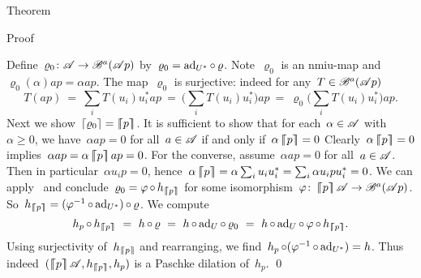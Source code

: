 \documentclass[b]{subfiles}
\begin{document}
\begin{parsec}
\begin{point}{Theorem}
\begin{point}{Proof}
\begin{point}
Define~$\varrho_0 \colon \mathscr{A} \to \mathscr{B}^a(\mathscr{A} p)$
    by~$\varrho_0 = \mathrm{ad}_{U^*} \mathop{\circ} \varrho$.
Note~$\varrho_0$ is an nmiu-map and~$\varrho_0(\alpha)ap = \alpha ap$.
The map~$\varrho_0$ is surjective:
    indeed for any~$T \in \mathscr{B}^a(\mathscr{A} p)$
\begin{equation*}
    T (ap) \ = \ \sum_i T( u_i ) u_i^* ap
           \ = \ \bigl(\sum_i T( u_i ) u_i^*\bigr) ap
           \ = \ \varrho_0 \bigl(\sum_i T( u_i ) u_i^*\bigr) ap.
\end{equation*}
Next we show~$\left\lceil\varrho_0\right\rceil = \left\lceil\!\!\left\lceil p\right\rceil\!\!\right\rceil$.
It is sufficient to show that for each~$\alpha \in \mathscr{A}$ with $\alpha \geq 0$,
    we have~$\alpha ap = 0$ for all~$a\in \mathscr{A}$ if and only if~$\alpha \left\lceil\!\!\left\lceil p\right\rceil\!\!\right\rceil = 0$
    Clearly~$\alpha \left\lceil\!\!\left\lceil p\right\rceil\!\!\right\rceil = 0$ implies~$\alpha ap = \alpha \left\lceil\!\!\left\lceil p\right\rceil\!\!\right\rceil ap= 0$.
For the converse, assume~$\alpha ap = 0$ for all~$a\in\mathscr{A}$.
Then in particular~$\alpha u_ip = 0$,
    hence~$\alpha \left\lceil\!\!\left\lceil p\right\rceil\!\!\right\rceil = \alpha \sum_i u_iu_i^*  = \sum_i \alpha u_ipu_i^*=0$.
We can apply~\TODO{}
    and conclude~$\varrho_0 = \varphi \mathop{\circ} h_{\left\lceil\!\!\left\lceil p\right\rceil\!\!\right\rceil}$
    for some isomorphism~$\varphi\colon
    \left\lceil\!\!\left\lceil p\right\rceil\!\!\right\rceil \mathscr{A} \to \mathscr{B}^a(\mathscr{A} p)$.
So~$h_{\left\lceil\!\!\left\lceil p\right\rceil\!\!\right\rceil} = (\varphi^{-1} \mathop{\circ} \mathrm{ad}_{U^*}) \mathop{\circ} \varrho$.
We compute
\begin{equation*}
h_p \after h_{\cceil{p}}
    \ =\  h \after \varrho
    \ =\ h \after \ad_U \after \varrho_0
    \ = \ h \after \ad_U \after \varphi \after h_{\cceil{p}}.
\end{equation*}
Using surjectivity of~$h_{\left\lceil\!\!\left\lceil p\right\rceil\!\!\right\rceil}$
and rearranging, we find~$h_p \mathop{\circ} (\varphi^{-1} \mathop{\circ} \mathrm{ad}_{U^*}) = h$.
Thus indeed~$(\cceil{p} \scrA, h_{\cceil{p}}, h_p)$
is a Paschke dilation of~$h_p$.  \qed
\end{point}
\end{point}
\end{point}
\end{parsec}
\end{document}
